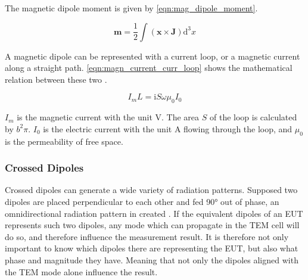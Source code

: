 The magnetic dipole moment is given by \autoref{eqn:mag_dipole_moment}.

\begin{equation}
    \mathbf{m}=\frac{1}{2}\int (\mathbf{x} \times \mathbf{J})\mathrm{d}^3x
    \label{eqn:mag_dipole_moment}
\end{equation}

A magnetic dipole can be represented with a current loop, or a magnetic current along a straight path. \autoref{eqn:magn_current_curr_loop} shows the mathematical relation between these two \cite{Balanis_1997}. 

\begin{equation}
    I_m L = \mathrm{i}S\omega\mu_0 I_0
    \label{eqn:magn_current_curr_loop}
\end{equation}

$I_m$ is the magnetic current with the unit $\mathrm{V}$. The area $S$ of the loop is calculated by $b^2\pi$. $I_0$ is the electric current with the unit $\mathrm{A}$ flowing through the loop, and $\mu_0$ is the permeability of free space.


\subsubsection{Crossed Dipoles}


Crossed dipoles can generate a wide variety of radiation patterns. Supposed two dipoles are placed perpendicular to each other and fed 90° out of phase, an omnidirectional radiation pattern in created \cite{7293591}. If the equivalent dipoles of an EUT represents such two dipoles, any mode which can propagate in the TEM cell will do so, and therefore influence the measurement result. It is therefore not only important to know which dipoles there are representing the EUT, but also what phase and magnitude they have. Meaning that not only the dipoles aligned with the TEM mode alone influence the result. 


